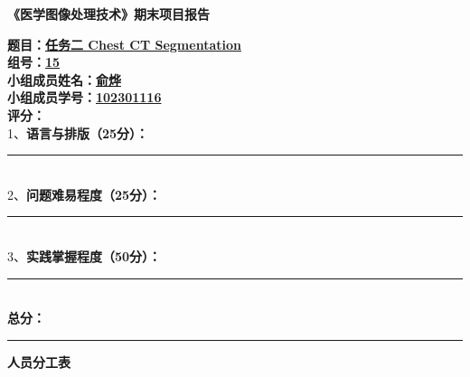 \documentclass[12pt, a4paper]{article}
\begin{document}

\thispagestyle{empty}
\begin{center}
    \vspace*{2cm}
    {\Huge \bfseries 《医学图像处理技术》期末项目报告} \\[2.5cm]

    \begin{flushleft}
        \hspace*{2cm}
        \begin{minipage}{0.9\textwidth}
            {\large \bfseries 题目：\underline{任务二 Chest CT Segmentation}} \\[1cm]

            {\large \bfseries 组号：\underline{15}} \\[0.6cm]

            {\large \bfseries 小组成员姓名：\underline{俞烨}} \\[0.6cm]

            {\large \bfseries 小组成员学号：\underline{102301116}} \\[0.8cm]

            {\large \bfseries 评分：} \\[0.4cm]

            {\normalsize 1、\bfseries 语言与排版（25分）：} \rule{8cm}{0.4pt} \\[0.4cm]

            {\normalsize 2、\bfseries 问题难易程度（25分）：} \rule{8cm}{0.4pt} \\[0.4cm]

            {\normalsize 3、\bfseries 实践掌握程度（50分）：} \rule{8cm}{0.4pt} \\[0.4cm]

            {\large \bfseries 总分：} \rule{12cm}{0.4pt}
        \end{minipage}
    \end{flushleft}
\end{center}

\thispagestyle{empty}
\clearpage

\begin{center}
    {\LARGE \bfseries 人员分工表} \\[1.2cm]
\end{center}
\end{document}
